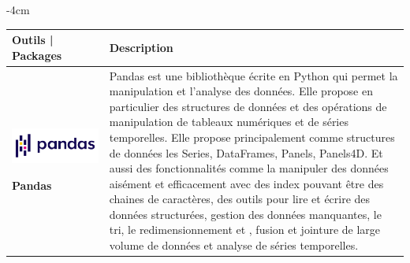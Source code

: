 \begin{table}[H]
	\centering
	\addtolength{\leftskip} {-4cm}
	\addtolength{\rightskip}{-4.5cm}
	\begin{tabular}{|m{5cm}|m{14cm}|}
	\hline
	\rowcolor{blueforest}
	\color{white} \textbf{Outils | Packages} & \color{white} \textbf{Description}  \\
	\hline\hline
	\begin{center}
	    \begin{minipage}{.3\textwidth}
      \includegraphics[width=\textwidth]{images/chapitre7/pandas.png}
    \end{minipage}
	\end{center}
  \centering \textbf{Pandas} \cite{mckinney2010data} & Pandas est une bibliothèque écrite en Python qui permet la manipulation et l'analyse des données. Elle propose en particulier des structures de données et des opérations de manipulation de tableaux numériques et de séries temporelles. Elle propose principalement comme structures de données les Series, DataFrames, Panels, Panels4D. Et aussi des fonctionnalités comme la manipuler des données aisément et efficacement avec des index pouvant être des chaines de caractères, des outils pour lire et écrire des données structurées, gestion des données manquantes, le tri, le redimensionnement et , fusion et jointure de large volume de données et analyse de séries temporelles. \\ \hline


\end{tabular}
\end{table}
